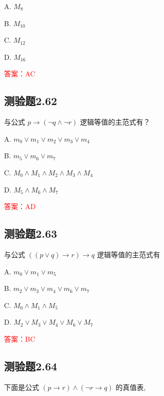 \documentclass[UTF8, heading=true]{ctexart}
\begin{document}
A. $ M_8$

B. $M_{10}$

C. $ M_{12}$

D. $ M_{16}$

\textcolor{red}{答案：AC}

\subsection{测验题2.62}

与公式 $p \rightarrow(\neg q \wedge \neg r)$ 逻辑等值的主范式有？

A. $
m_0 \vee m_1 \vee m_2 \vee m_3 \vee m_4
$


B. $
m_5 \vee m_6 \vee m_7
$


C. $
M_0 \wedge M_1 \wedge M_2 \wedge M_3 \wedge M_4
$


D. $
M_5 \wedge M_6 \wedge M_7
$

\textcolor{red}{答案：AD}


\subsection{测验题2.63}

与公式 $((p \vee q) \rightarrow r) \rightarrow q$ 逻辑等值的主范式有 $\qquad$

A. $ m_0 \vee m_1 \vee m_5$

B. $ m_2 \vee m_3 \vee m_4 \vee m_6 \vee m_7$

C. $ M_0 \wedge M_1 \wedge M_5$

D. $ M_2 \vee M_3 \vee M_4 \vee M_6 \vee M_7$

\textcolor{red}{答案：BC}

\subsection{测验题2.64}

下面是公式 $(p \rightarrow r) \wedge(\neg r \rightarrow q)$ 的真值表,
\end{document}
